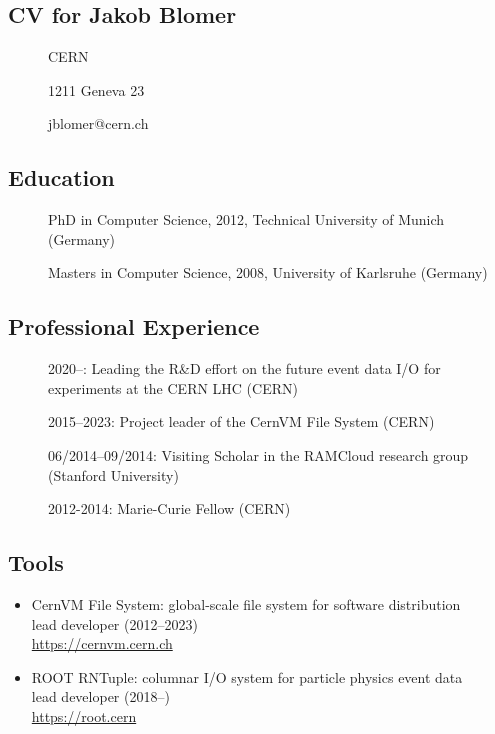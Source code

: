 
\subsection{CV for Jakob Blomer}
\begin{description}
\item[] CERN
\item[] 1211 Geneva 23
\item[] jblomer@cern.ch
\end{description}

\subsection*{Education}
\begin{description}
    \item[] PhD in Computer Science, 2012, Technical University of Munich (Germany)
    \item[] Masters in Computer Science, 2008, University of Karlsruhe (Germany)
\end{description}

\subsection*{Professional Experience}
\begin{description}
    \item[] 2020--: Leading the R\&D effort on the future event data I/O for experiments at the CERN LHC (CERN)
    \item[] 2015--2023: Project leader of the CernVM File System (CERN)
    \item[] 06/2014--09/2014: Visiting Scholar in the RAMCloud research group (Stanford University)
    \item[] 2012-2014: Marie-Curie Fellow (CERN)
\end{description}

\subsection*{Tools}

\begin{itemize}
    \item[] CernVM File System: global-scale file system for software distribution
    \\lead developer (2012--2023)
    \\{\small{\url{https://cernvm.cern.ch}}}
    \item[] ROOT RNTuple: columnar I/O system for particle physics event data\\lead developer (2018--)\\{\small{\url{https://root.cern}}}
\end{itemize}

